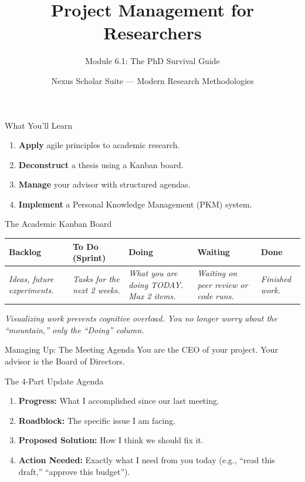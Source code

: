 \documentclass[aspectratio=169]{beamer}
\title{Project Management for Researchers}
\subtitle{Module 6.1: The PhD Survival Guide}
\author{Nexus Scholar Suite --- Modern Research Methodologies}
\date{}
\begin{document}
\begin{frame}[plain]
  \titlepage
\end{frame}

\begin{frame}{What You'll Learn}
  \begin{enumerate}
    \item \textbf{Apply} agile principles to academic research.
    \item \textbf{Deconstruct} a thesis using a Kanban board.
    \item \textbf{Manage} your advisor with structured agendas.
    \item \textbf{Implement} a Personal Knowledge Management (PKM) system.
  \end{enumerate}
\end{frame}

\begin{frame}{The Academic Kanban Board}
  \begin{center}
  \begin{tabular}{|p{2.5cm}|p{2.5cm}|p{2.5cm}|p{2.5cm}|p{2.5cm}|}
  \hline
  \textbf{Backlog} & \textbf{To Do (Sprint)} & \textbf{Doing} & \textbf{Waiting} & \textbf{Done} \\
  \hline
  \textit{Ideas, future experiments.} & \textit{Tasks for the next 2 weeks.} & \textit{What you are doing TODAY. Max 2 items.} & \textit{Waiting on peer review or code runs.} & \textit{Finished work.} \\
  \hline
  \end{tabular}
  \end{center}
  \vspace{0.5cm}
  \textit{Visualizing work prevents cognitive overload. You no longer worry about the ``mountain,'' only the ``Doing'' column.}
\end{frame}

\begin{frame}{Managing Up: The Meeting Agenda}
  You are the CEO of your project. Your advisor is the Board of Directors.
  \vspace{0.3cm}
  \begin{exampleblock}{The 4-Part Update Agenda}
    \begin{enumerate}
      \item \textbf{Progress:} What I accomplished since our last meeting.
      \item \textbf{Roadblock:} The specific issue I am facing.
      \item \textbf{Proposed Solution:} How I think we should fix it.
      \item \textbf{Action Needed:} Exactly what I need from you today (e.g., ``read this draft,'' ``approve this budget'').
    \end{enumerate}
  \end{exampleblock}
\end{frame}
\end{document}
